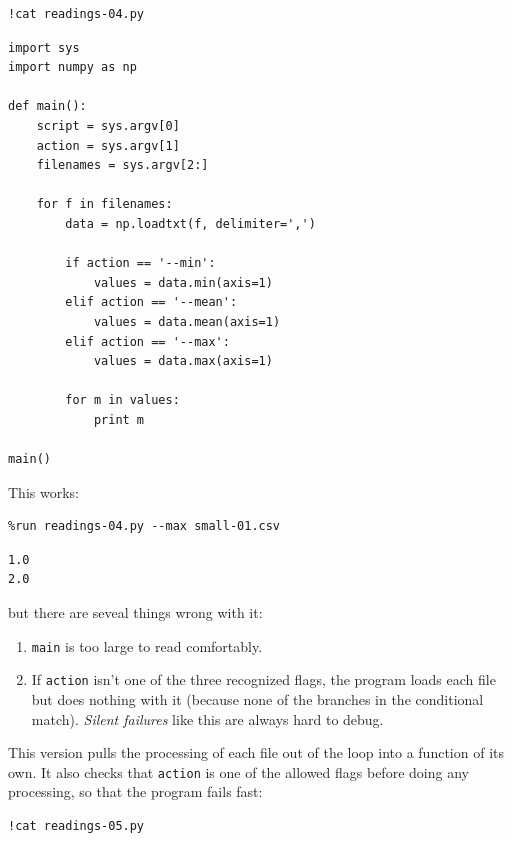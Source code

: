 \documentclass[]{book}
\newcommand{\gdef}[2]{\emph{#2}}
\begin{document}
\begin{verbatim}
!cat readings-04.py
\end{verbatim}

\begin{verbatim}
import sys
import numpy as np

def main():
    script = sys.argv[0]
    action = sys.argv[1]
    filenames = sys.argv[2:]

    for f in filenames:
        data = np.loadtxt(f, delimiter=',')

        if action == '--min':
            values = data.min(axis=1)
        elif action == '--mean':
            values = data.mean(axis=1)
        elif action == '--max':
            values = data.max(axis=1)

        for m in values:
            print m

main()
\end{verbatim}

This works:

\begin{verbatim}
%run readings-04.py --max small-01.csv
\end{verbatim}

\begin{verbatim}
1.0
2.0
\end{verbatim}

but there are seveal things wrong with it:

\begin{enumerate}
\item
  \texttt{main} is too large to read comfortably.
\item
  If \texttt{action} isn't one of the three recognized flags, the
  program loads each file but does nothing with it (because none of the
  branches in the conditional match). \gdef{g:silent-failure}{Silent
  failures} like this are always hard to debug.
\end{enumerate}

This version pulls the processing of each file out of the loop into a
function of its own. It also checks that \texttt{action} is one of the
allowed flags before doing any processing, so that the program fails
fast:

\begin{verbatim}
!cat readings-05.py
\end{verbatim}
\end{document}
